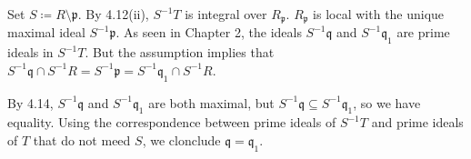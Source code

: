 Set $S\coloneqq R\setminus \mathfrak{p}$.
By 4.12(ii), $S^{-1}T$ is integral over $R_{\mathfrak{p}}$.
$R_{\mathfrak{p}}$ is local with the unique maximal ideal $S^{-1}\mathfrak{p}$.
As seen in Chapter 2, the ideals $S^{-1}\mathfrak{q}$ and $S^{-1}\mathfrak{q}_1$
are prime ideals in $S^{-1}T$. But the assumption implies that
$S^{-1}\mathfrak{q}\cap S^{-1}R = S^{-1}\mathfrak{p} = S^{-1}\mathfrak{q}_1 \cap S^{-1}R$.

By 4.14, $S^{-1}\mathfrak{q}$ and $S^{-1}\mathfrak{q}_1$ are both maximal, but
$S^{-1}\mathfrak{q} \subseteq S^{-1}\mathfrak{q}_1$, so we have equality. Using
the correspondence between prime ideals of $S^{-1}T$ and prime ideals of  $T$ that
do not meed $S$, we clonclude $\mathfrak{q} = \mathfrak{q}_1$.
